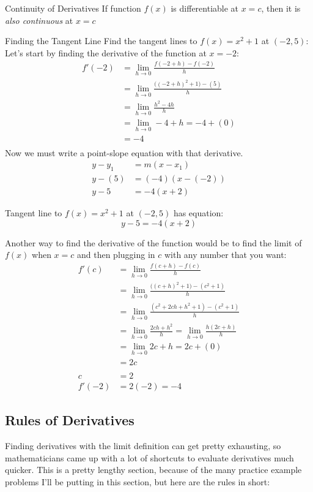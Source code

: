 \documentclass{MathNotes}
\begin{document}
\begin{theorem}{Continuity of Derivatives}
    If function $f(x)$ is differentiable at $x=c$, then it is 
    \textit{also continuous} at $x=c$
\end{theorem}

\begin{example}{Finding the Tangent Line}
    Find the tangent lines to $f(x)=x^2+1$ at $(-2, 5)$:
    \br
    Let's start by finding the derivative of the function at $x=-2$:
    \begin{align*}
        f'(-2)&=\lim_{h\to 0}\frac{f(-2+h)-f(-2)}{h} \\
        &=\lim_{h\to 0}\frac{\bigl((-2+h)^2+1\bigr)-(5)}{h} \\
        &=\lim_{h\to 0}\frac{h^2-4h}{h} \\
        &=\lim_{h\to 0}-4+h = -4 + (0)\\
        &=-4\\
    \end{align*}
    Now we must write a point-slope equation with that derivative. 
    \begin{align*}
        y-y_1&=m(x-x_1) \\
        y-(5)&=(-4)(x-(-2)) \\
        y-5&=-4(x+2)
    \end{align*}

    Tangent line to $f(x)=x^2+1$ at $(-2, 5)$ has equation: $$y-5=-4(x+2)$$
\end{example}

Another way to find the derivative of the function would be to find the limit
of $f(x)$ when $x=c$ and then plugging in $c$ with any number that you want:
\begin{align*}
    f'(c)&=\lim_{h\to 0}\frac{f(c+h)-f(c)}{h} \\
    &=\lim_{h\to 0}\frac{\bigl((c+h)^2+1\bigr)-(c^2+1)}{h} \\
    &=\lim_{h\to 0}\frac{(c^2+2ch+h^2+1)-(c^2+1)}{h} \\
    &=\lim_{h\to 0}\frac{2ch+h^2}{h} = \lim_{h\to 0}\frac{h(2c+h)}{h}\\
    &=\lim_{h\to 0} 2c+h=2c+(0)\\
    &=2c\\
    \\
    c&=2\\
    f'(-2)&=2(-2)=-4
\end{align*}

\newpage
\subsection{Rules of Derivatives}
Finding derivatives with the limit definition can get pretty exhausting, so
mathematicians came up with a lot of shortcuts to evaluate derivatives much
quicker. This is a pretty lengthy section, because of the many practice example 
problems I'll be putting in this section, but here are the rules in short:
\end{document}
